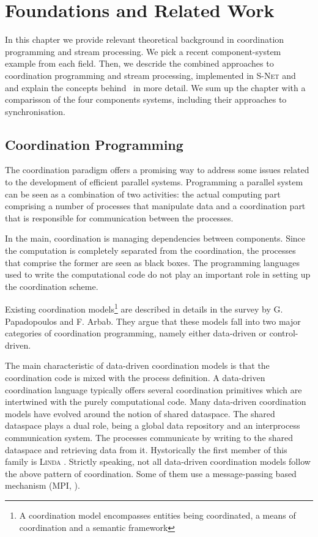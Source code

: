 \chapter{Foundations and Related Work}
In this chapter we provide relevant theoretical background in coordination programming and stream processing. We pick a recent component-system example from each field. Then, we descride the combined approaches to coordination programming and stream processing, implemented in \textsc{S-Net} and \ak\, and explain the concepts behind \ak\ in more detail. We sum up the chapter with a comparisson of the four components systems, including their approaches to synchronisation.


    \section{Coordination Programming}
The coordination paradigm offers a promising way to address some issues related to the development of efficient parallel systems. Programming a parallel system can be seen as a combination of two activities: the actual computing part comprising a number of processes that manipulate data and a coordination part that is responsible for communication between the processes.

In the main, coordination is managing dependencies between components. Since the computation is completely separated from the coordination, the processes that comprise the former are seen as black boxes. The programming languages used to write the computational code do not play an important role in setting up the coordination scheme.

Existing coordination models\footnote{A coordination model encompasses entities being coordinated, a means of coordination and a semantic framework} are described in details in the survey \cite{papadopoulos} by G. Papadopoulos and F. Arbab. They argue that these models fall into two major categories of coordination programming, namely either data-driven or control-driven.

The main characteristic of data-driven coordination models is that the coordination code is mixed with the process definition. A data-driven coordination language typically offers several coordination primitives which are intertwined with the purely computational code. Many data-driven coordination models have evolved around the notion of shared dataspace. The shared dataspace plays a dual role, being a global data repository and an interprocess communication system. The processes communicate by writing to the shared dataspace and retrieving data from it. Hystorically the first member of this family is \textsc{Linda} \cite{linda}. Strictly speaking, not all data-driven coordination models follow the above pattern of coordination. Some of them use a message-passing based mechanism (\textsc{MPI}, \cite{mpi}).


